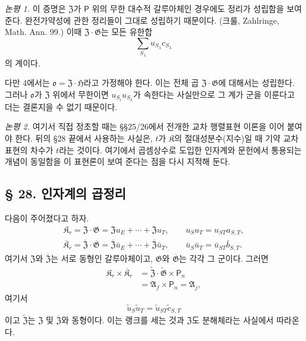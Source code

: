 \noindent\emph{논평 1.} 이 증명은 \(\mathfrak Z\)가 \(\mathsf P\) 위의 무한 대수적 갈루아체인 경우에도 정리가 성립함을 보여 준다. 완전가약성에 관한 정리들이 그대로 성립하기 때문이다. (크룰, Zahlringe, Math. Ann. 99.) 이때 \(\mathfrak Z\mathbin{\cdot}\mathfrak G\)는 모든 유한합
\[
        \sum_{S_\lambda}u_{S_\lambda}c_{S_\lambda}
\]
의 계이다.

다만 4에서는 \(\mathfrak o=\mathfrak Z\mathbin{\cdot}\mathfrak H\)라고 가정해야 한다. 이는 전체 곱 \(\mathfrak Z\mathbin{\cdot}\mathfrak G\)에 대해서는 성립한다. 그러나 \(\mathfrak o\)가 \(\mathfrak Z\) 위에서 무한이면 \(u_{S_i}u_{S_k}\)가 속한다는 사실만으로 그 계가 군을 이룬다고 더는 결론지을 수 없기 때문이다.

\noindent\emph{논평 2.} 여기서 직접 정초할 때는 §§25/26에서 전개한 교차 행렬표현 이론을 이어 붙여야 한다. 뒤의 §28 끝에서 사용하는 사실은, \(t\)가 \(\mathfrak K\)의 절대성분수(지수)일 때 기약 교차표현의 차수가 \(t\)라는 것이다. 여기에서 곱셈상수로 도입한 인자계와 문헌에서 통용되는 개념이 동일함을 이 표현론이 보여 준다는 점을 다시 지적해 둔다.

\subsection*{§ 28. 인자계의 곱정리}

다음이 주어졌다고 하자.
\[
\begin{gathered}
\mathfrak K_r
 =\mathfrak Z\mathbin{\cdot}\mathfrak G
 =\mathfrak Zu_E+\cdots+\mathfrak Zu_T,
\qquad
u_Su_T=u_{ST}a_{S,T},\\
\overline{\mathfrak K}_r
 =\overline{\mathfrak Z}\mathbin{\cdot}\overline{\mathfrak G}
 =\overline{\mathfrak Z}\bar u_E+
  \cdots+
  \overline{\mathfrak Z}\bar u_T,
\qquad
\bar u_S\bar u_T=\bar u_{ST}\bar b_{S,T}.
\end{gathered}
\]
여기서 \(\mathfrak Z\)와 \(\overline{\mathfrak Z}\)는 서로 동형인 갈루아체이고, \(\mathfrak G\)와 \(\overline{\mathfrak G}\)는 각각 그 군이다. 그러면
\[
\begin{aligned}
\mathfrak K_r\times\overline{\mathfrak K}_r
 &=\widetilde{\mathfrak Z}
   \mathbin{\cdot}\widetilde{\mathfrak G}
   \times\mathsf P_n\\
 &=\mathfrak A_f\times\mathsf P_n
  =\mathfrak A_j,
\end{aligned}
\]
여기서
\[
        \tilde u_S\tilde u_T
        =\tilde u_{ST}\tilde c_{S,T}
\]
이고 \(\widetilde{\mathfrak Z}\)는 \(\mathfrak Z\) 및 \(\overline{\mathfrak Z}\)와 동형이다. 이는 랭크를 세는 것과 \(\mathfrak Z\)도 분해체라는 사실에서 따라온다.

